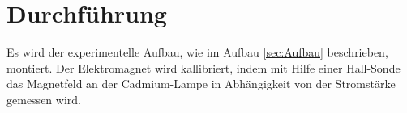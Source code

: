 
\section{Durchführung}
\label{sec:Durchführung}
Es wird der experimentelle Aufbau, wie im Aufbau \ref{sec:Aufbau} beschrieben, montiert. Der Elektromagnet wird kallibriert, indem mit Hilfe einer Hall-Sonde das Magnetfeld an der Cadmium-Lampe in Abhängigkeit von der Stromstärke gemessen wird. 
